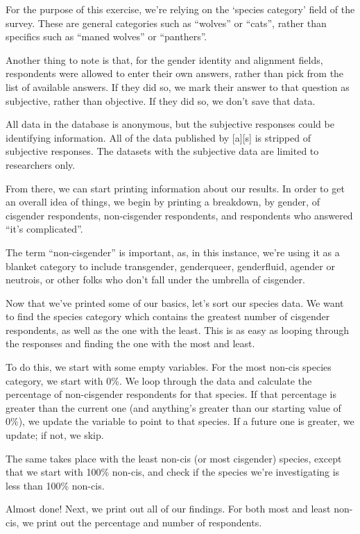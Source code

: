 For the purpose of this exercise, we're relying on the `species category' field of the survey. These are general categories such as ``wolves'' or ``cats'', rather than specifics such as ``maned wolves'' or ``panthers''.

Another thing to note is that, for the gender identity and alignment fields, respondents were allowed to enter their own answers, rather than pick from the list of available answers. If they did so, we mark their answer to that question as subjective, rather than objective. If they did so, we don't save that data.

All data in the database is anonymous, but the subjective responses could be identifying information. All of the data published by {[}a{]}{[}s{]} is stripped of subjective responses. The datasets with the subjective data are limited to researchers only.

From there, we can start printing information about our results. In order to get an overall idea of things, we begin by printing a breakdown, by gender, of cisgender respondents, non-cisgender respondents, and respondents who answered ``it's complicated''.

The term ``non-cisgender'' is important, as, in this instance, we're using it as a blanket category to include transgender, genderqueer, genderfluid, agender or neutrois, or other folks who don't fall under the umbrella of cisgender.

Now that we've printed some of our basics, let's sort our species data. We want to find the species category which contains the greatest number of cisgender respondents, as well as the one with the least. This is as easy as looping through the responses and finding the one with the most and least.

To do this, we start with some empty variables. For the most non-cis species category, we start with 0\%. We loop through the data and calculate the percentage of non-cisgender respondents for that species. If that percentage is greater than the current one (and anything's greater than our starting value of 0\%), we update the variable to point to that species. If a future one is greater, we update; if not, we skip.

The same takes place with the least non-cis (or most cisgender) species, except that we start with 100\% non-cis, and check if the species we're investigating is less than 100\% non-cis.

Almost done! Next, we print out all of our findings. For both most and least non-cis, we print out the percentage and number of respondents.

